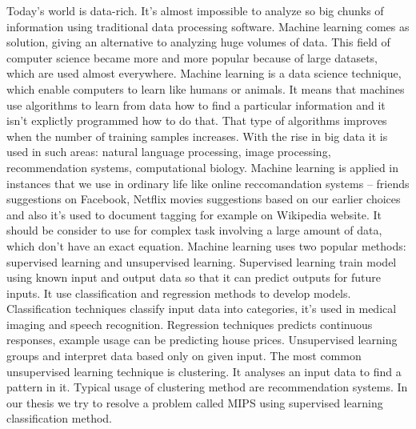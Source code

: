 Today’s world is data-rich. It’s almost impossible to analyze so big chunks of information using traditional data processing software.
Machine learning comes as solution, giving an alternative to analyzing huge volumes of data. 
This field of computer science became more and more popular because of large datasets, which are used almost everywhere. 
Machine learning is a data science technique, which enable computers to learn like humans or animals. It means that machines use algorithms to learn from data how to find a particular information and it isn’t explictly programmed how to do that. 
That type of algorithms improves when the number of training samples increases. 
With the rise in big data it is used in such areas: natural language processing, image processing, recommendation systems, computational biology. Machine learning is applied in instances that we use in ordinary life like online reccomandation systems – friends suggestions on Facebook, Netflix movies suggestions based on our earlier choices and also it’s used to document tagging for example on Wikipedia website. 
It should be consider to use for complex task involving a large amount of data, which don’t have an exact equation. 
Machine learning uses two popular methods: supervised learning and unsupervised learning. 
Supervised learning train model using known input and output data so that it can predict outputs for future inputs.
It use classification and regression methods to develop models. 
Classification techniques classify input data into categories, it’s used in medical imaging and speech recognition. 
Regression techniques predicts continuous responses, example usage can be predicting house prices. Unsupervised learning groups and interpret data based only on given input. 
The most common unsupervised learning technique is clustering. 
It analyses an input data to find a pattern in it. Typical usage of clustering method are recommendation systems. In our thesis we try to resolve a problem called MIPS using supervised learning classification method. 

